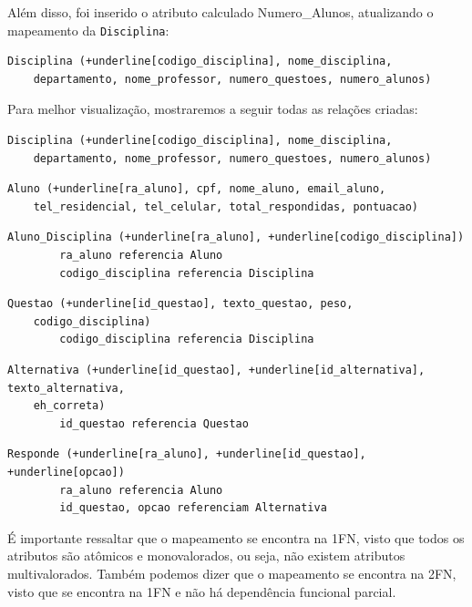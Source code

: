 \documentclass[12pt,a4paper]{article}
\begin{document}
Além disso, foi inserido o atributo calculado Numero\_Alunos, atualizando o mapeamento da \texttt{Disciplina}:

\begin{Verbatim}[commandchars=+\[\]]
    Disciplina (+underline[codigo_disciplina], nome_disciplina,
    departamento, nome_professor, numero_questoes, numero_alunos)
\end{Verbatim}

Para melhor visualização, mostraremos a seguir todas as relações criadas:\\

\begin{Verbatim}[commandchars=+\[\]]
    Disciplina (+underline[codigo_disciplina], nome_disciplina,
    departamento, nome_professor, numero_questoes, numero_alunos)
\end{Verbatim}

\begin{Verbatim}[commandchars=+\[\]]
    Aluno (+underline[ra_aluno], cpf, nome_aluno, email_aluno, 
    tel_residencial, tel_celular, total_respondidas, pontuacao)
\end{Verbatim}

\begin{Verbatim}[commandchars=+\[\]]
    Aluno_Disciplina (+underline[ra_aluno], +underline[codigo_disciplina])
        ra_aluno referencia Aluno
        codigo_disciplina referencia Disciplina
\end{Verbatim}

\begin{Verbatim}[commandchars=+\[\]]
    Questao (+underline[id_questao], texto_questao, peso,
    codigo_disciplina)
        codigo_disciplina referencia Disciplina
\end{Verbatim}

\begin{Verbatim}[commandchars=+\[\]]
    Alternativa (+underline[id_questao], +underline[id_alternativa], texto_alternativa, 
    eh_correta)
        id_questao referencia Questao
\end{Verbatim}

\begin{Verbatim}[commandchars=+\[\]]
    Responde (+underline[ra_aluno], +underline[id_questao], +underline[opcao])
        ra_aluno referencia Aluno
        id_questao, opcao referenciam Alternativa
\end{Verbatim}

É importante ressaltar que o mapeamento se encontra na 1FN, visto que todos os atributos são atômicos e monovalorados, ou seja, não existem atributos multivalorados. Também podemos dizer que o mapeamento se encontra na 2FN, visto que se encontra na 1FN e não há dependência funcional parcial.\\
\end{document}
